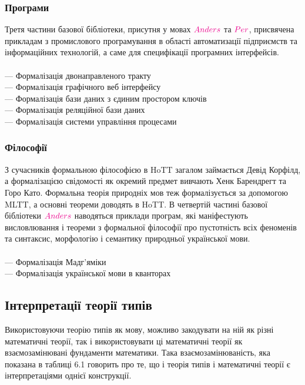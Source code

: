 \newpage
\subsubsection{Програми}

Третя частини базової бібліотеки, присутня у мовах $\textcolor{magenta}{Anders}$ та $\textcolor{magenta}{Per}$,
присвячена прикладам з промислового програмування в області автоматизації
підприємств та інформаційних технологій, а саме для специфікації програмних інтерфейсів.
\\
\\
\noindent --- Формалізація двонаправленого тракту \\
--- Формалізація графічного веб інтерфейсу \\
--- Формалізація бази даних з єдиним простором ключів \\
--- Формалізація реляційної бази даних \\
--- Формалізація системи управління процесами \\

\subsubsection{Філософії}

З сучасників формальною філософією в HoTT загалом займається Девід Корфілд,
а формалізацією свідомості як окремий предмет вивчають Хенк Барендрегт та Горо Като.
Формальна теорія природніх мов теж формалізується за допомогою MLTT,
а основні теореми доводять в HoTT. В четвертій частині базової
бібліотеки $\textcolor{magenta}{Anders}$ наводяться приклади програм, які
маніфестують висловлювання і теореми з формальної філософії про пустотність
всіх феноменів та синтаксис, морфологію і семантику природньої української мови.
\\
\\
\noindent
--- Формалізація Мадг'яміки \\
--- Формалізація української мови в кванторах
\newpage
\subsection{Інтерпретації теорії типів}
Використовуючи теорію типів як мову, можливо закодувати на ній як
різні математичні теорії, так і використовувати ці математичні
теорії як взаємозамінювані фундаменти математики.
Така взаємозамінюваність, яка показана в таблиці 6.1 говорить про те,
що і теорія типів і математичні теорії є інтерпретаціями однієї конструкції.

